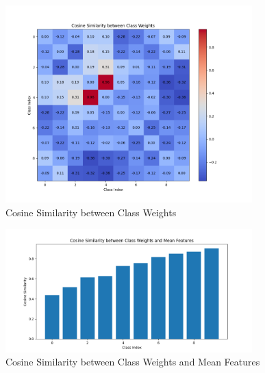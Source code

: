 \documentclass{article}
\begin{document}
\begin{figure}[h!]
\centering
\includegraphics[width=0.85\textwidth]{Plot/stage/cos_VS_5000_50_epoch_199.png}
\caption{Cosine Similarity between Class Weights}
\end{figure}
\hfill
\begin{figure}[h!]
\centering
\includegraphics[width=0.85\textwidth]{Plot/stage/Wi_Hi_cos_VSres50_epoch_199.png}
\caption{Cosine Similarity between Class Weights and Mean Features}
\end{figure}
\end{document}
